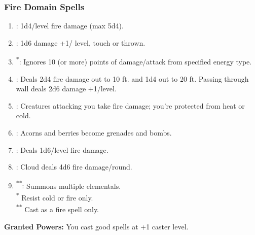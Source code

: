 \subsubsection{Fire Domain Spells}
\begin{enumerate}
	\item{:} 1d4/level fire damage (max 5d4).
	\item{:} 1d6 damage +1/ level, touch or thrown.
	\item{\textsuperscript{*}:} Ignores 10 (or more) points of damage/attack from specified energy type.
	\item{:} Deals 2d4 fire damage out to 10 ft. and 1d4 out to 20 ft. Passing through wall deals 2d6 damage +1/level.
	\item{:} Creatures attacking you take fire damage; you’re protected from heat or cold.
	\item{:} Acorns and berries become grenades and bombs.
	\item{:} Deals 1d6/level fire damage.
	\item{:} Cloud deals 4d6 fire damage/round.
	\item{\textsuperscript{**}:} Summons multiple elementals.
	\\ \textsuperscript{*} Resist cold or fire only.
	\\ \textsuperscript{**} Cast as a fire spell only.
\end{enumerate}

\textbf{Granted Powers:} You cast good spells at +1 caster level.
